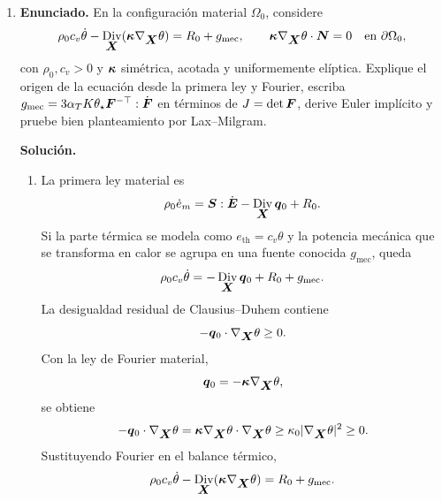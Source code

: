 \documentclass[11pt]{article}
\newcommand{\norm}[1]{\left\lVert #1\right\rVert}
\newcommand{\abs}[1]{\left|#1\right|}
\def\vec   #1{\mbox{\boldmath $#1$}{}}
\def\ten   #1{\mbox{\boldmath $#1$}{}}
\DeclareMathOperator{\Div}{Div}
\begin{document}
\begin{enumerate}[label=\textbf{\arabic*.}, leftmargin=*]
\begin{enumerate}[label=(\alph*)]
\[            \sup_{\vec w\in V\setminus\{\vec0\}}
            \frac{\abs{b(\vec w,q)}}{\norm{\vec w}_{H^1(\Omega)}\norm{q}_{L^2(\Omega)}}
            \ge\beta>0,
        \]
        y $\vec f\in H^{-1}(\Omega)^d$, entonces $F(\vec w)=\langle\vec f,\vec w\rangle$ es continuo en $V$. El teorema de Brezzi da existencia y unicidad de $(\vec v,p)\in V\times Q$, junto con
        \[
            \norm{\vec v}_{H^1(\Omega)}+\norm{p}_{L^2(\Omega)}
            \le C\norm{\vec f}_{H^{-1}(\Omega)}.
        \]
        El caso $\alpha=0$ sigue cubierto. El caso $\mu=0$ no queda cubierto por esta formulación, porque ya no se controla la norma $H^1$ de la velocidad.
    \end{enumerate}

    \item \textbf{Enunciado.} En la configuración material $\Omega_0$, considere
    \[
        \rho_0c_v\dot\theta-\Div_{\vec X}(\ten\kappa\nabla_{\vec X}\theta)
        =
        R_0+g_{\mathrm{mec}},
        \qquad
        \ten\kappa\nabla_{\vec X}\theta\cdot\vec N=0\quad\text{en }\partial\Omega_0,
    \]
    con $\rho_0,c_v>0$ y $\ten\kappa$ simétrica, acotada y uniformemente elíptica. Explique el origen de la ecuación desde la primera ley y Fourier, escriba $g_{\mathrm{mec}}=3\alpha_TK\theta_\star\ten F^{-\top}:\dot{\ten F}$ en términos de $J=\det\ten F$, derive Euler implícito y pruebe bien planteamiento por Lax--Milgram.

    \textbf{Solución.}
    \begin{enumerate}[label=(\alph*)]
        \item La primera ley material es
        \[
            \rho_0\dot e_m=\ten S:\dot{\ten E}-\Div_{\vec X}\vec q_0+R_0.
        \]
        Si la parte térmica se modela como $e_{\mathrm{th}}=c_v\theta$ y la potencia mecánica que se transforma en calor se agrupa en una fuente conocida $g_{\mathrm{mec}}$, queda
        \[
            \rho_0c_v\dot\theta=-\Div_{\vec X}\vec q_0+R_0+g_{\mathrm{mec}}.
        \]
        La desigualdad residual de Clausius--Duhem contiene
        \[
            -\vec q_0\cdot\nabla_{\vec X}\theta\ge0.
        \]
        Con la ley de Fourier material,
        \[
            \vec q_0=-\ten\kappa\nabla_{\vec X}\theta,
        \]
        se obtiene
        \[
            -\vec q_0\cdot\nabla_{\vec X}\theta
            =
            \ten\kappa\nabla_{\vec X}\theta\cdot\nabla_{\vec X}\theta
            \ge \kappa_0|\nabla_{\vec X}\theta|^2\ge0.
        \]
        Sustituyendo Fourier en el balance térmico,
        \[
            \rho_0c_v\dot\theta-\Div_{\vec X}(\ten\kappa\nabla_{\vec X}\theta)
            =
            R_0+g_{\mathrm{mec}}.
        \]


\end{enumerate}
\end{enumerate}
\end{document}
